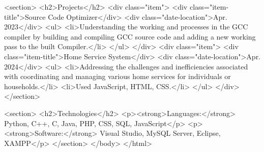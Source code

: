  <section>
    <h2>Projects</h2>
    <div class="item">
      <div class="item-title">Source Code Optimizer</div>
      <div class="date-location">Apr. 2023</div>
      <ul>
        <li>Understanding the working and processes in the GCC compiler by building and compiling GCC source code and adding a new working pass to the built Compiler.</li>
      </ul>
    </div>
    <div class="item">
      <div class="item-title">Home Service System</div>
      <div class="date-location">Apr. 2024</div>
      <ul>
        <li>Addressing the challenges and inefficiencies associated with coordinating and managing various home services for individuals or households.</li>
        <li>Used JavaScript, HTML, CSS.</li>
      </ul>
    </div>
  </section>

  <section>
    <h2>Technologies</h2>
    <p><strong>Languages:</strong> Python, C++, C, Java, PHP, CSS, SQL, JavaScript</p>
    <p><strong>Software:</strong> Visual Studio, MySQL Server, Eclipse, XAMPP</p>
  </section>
</body>
</html>
